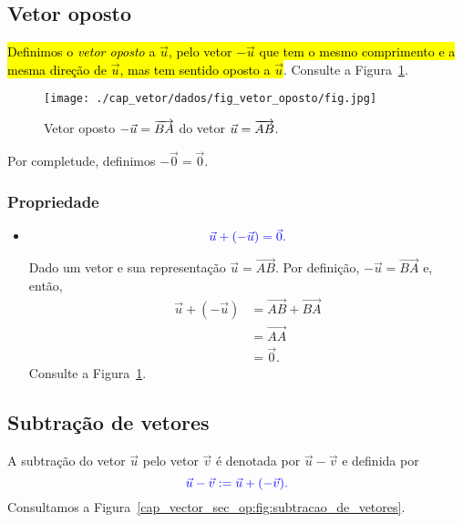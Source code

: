 \subsection{Vetor oposto}

\hl{Definimos o \emph{vetor oposto} a $\vec{u}$, pelo vetor $-\vec{u}$ que tem o mesmo comprimento e a mesma direção de $\vec{u}$, mas tem sentido oposto a $\vec{u}$}. Consulte a Figura~\ref{cap_vetor_sec_op:fig:vetor_oposto}.

\begin{figure}[h]
  \centering
  \texttt{[image: ./cap\_vetor/dados/fig\_vetor\_oposto/fig.jpg]}
  \caption{Vetor oposto $-\vec{u} = \protect\overrightarrow{BA}$ do vetor $\vec{u}=\protect\overrightarrow{AB}$.}
  \label{cap_vetor_sec_op:fig:vetor_oposto}
\end{figure}

\begin{obs}
  Por completude, definimos $-\vec{0} = \vec{0}$.
\end{obs}

\subsubsection{Propriedade}

\begin{itemize}
  \item {}
  \begin{equation}\color{blue}\vec{u} + (-\vec{u}) = \vec{0}.
  \end{equation}
  
  Dado um vetor e sua representação $\vec{u} = \overrightarrow{AB}$. Por definição, $-\vec{u} = \overrightarrow{BA}$ e, então, 
  \begin{align}
    \vec{u} + (-\vec{u}) &= \overrightarrow{AB} + \overrightarrow{BA}\\
    &= \overrightarrow{AA}\\
    &= \vec{0}.
  \end{align}
  Consulte a Figura~\ref{cap_vetor_sec_op:fig:vetor_oposto}.
\end{itemize}

\subsection{Subtração de vetores}

A subtração do vetor $\vec{u}$ pelo vetor $\vec{v}$ é denotada por $\vec{u} - \vec{v}$ e definida por
\begin{equation}\color{blue}\vec{u} - \vec{v} := \vec{u} + (-\vec{v}).  
\end{equation}
 Consultamos a Figura~\ref{cap_vector_sec_op:fig:subtracao_de_vetores}.

